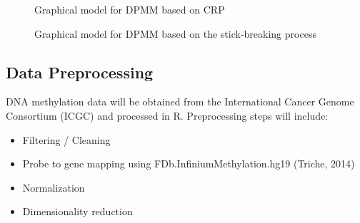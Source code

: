 \documentclass{article}
\begin{document}
\begin{figure}[!htp]
	\centering
	\begin{minipage}{0.45\textwidth}
		\centering
		\caption{Graphical model for DPMM based on CRP}
	\end{minipage}\hfill
	\begin{minipage}{0.45\textwidth}
		\centering
		\vspace{1.35cm}
		\caption{Graphical model for DPMM based on the stick-breaking process}
	\end{minipage}
\end{figure}

\subsection{Data Preprocessing}
DNA methylation data will be obtained from the International Cancer Genome Consortium (ICGC) and processed in R. Preprocessing steps will include:

\begin{itemize}
\item Filtering / Cleaning
\item Probe to gene mapping using FDb.InfiniumMethylation.hg19 (Triche, 2014)
\item Normalization
\item Dimensionality reduction
\end{itemize}
\end{document}
